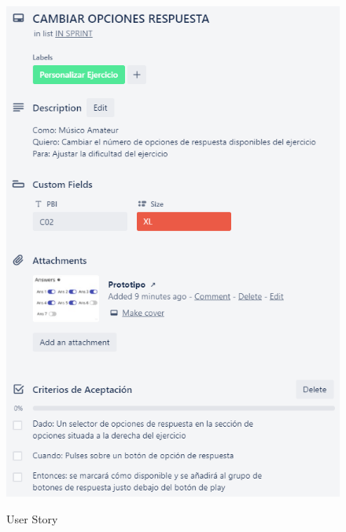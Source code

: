 \documentclass[12pt,twoside,titlepage]{report}
\begin{document}
\begin{figure}[H]
    \centering
    \includegraphics[scale=1.3]{Scrum/User Stories/CambiarRespuestas}
    \label{fig:CambiarRespuestas}
    \caption{User Story}
\end{figure}
\end{document}
